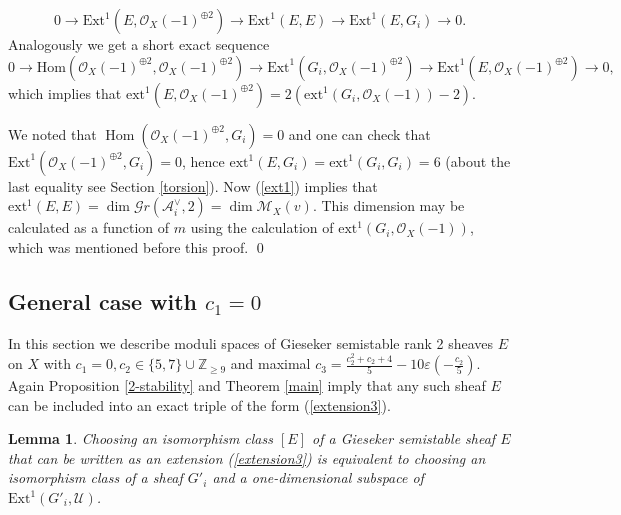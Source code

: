 \documentclass{amsart}
\DeclareMathOperator{\Hom}{Hom}
\newtheorem{lemma}[theorem]{Lemma}
\begin{document}
\begin{equation}\label{ext1}0\to\mathrm{Ext}^1(E,\mathcal O_X(-1)^{\oplus 2})\to\mathrm{Ext}^1(E,E)\to\mathrm{Ext}^1(E,G_i)\to 0.
\end{equation}
Analogously we get a short exact sequence
$$0\to\mathrm{Hom}(\mathcal O_X(-1)^{\oplus 2},\mathcal O_X(-1)^{\oplus 2})\to\mathrm{Ext}^1(G_i,\mathcal O_X(-1)^{\oplus 2})\to\mathrm{Ext}^1(E,\mathcal O_X(-1)^{\oplus 2})\to 0,$$
which implies that $\mathrm{ext}^1(E,\mathcal O_X(-1)^{\oplus 2})=2(\mathrm{ext}^1(G_i,\mathcal O_X(-1))-2)$. 

We noted that $\Hom(\mathcal O_X(-1)^{\oplus 2},G_i)=0$ and one can check that $\mathrm{Ext}^1(\mathcal O_X(-1)^{\oplus 2},G_i)=0$, hence $\mathrm{ext}^1(E,G_i)=\mathrm{ext}^1(G_i,G_i)=6$ (about the last equality see Section \ref{torsion}).  
Now (\ref{ext1}) implies that $\mathrm{ext}^1(E,E)=\dim \mathcal Gr(\mathcal A_i^\vee,2)=\dim \mathcal M_X(v)$. This dimension may be calculated as a function of $m$ using the calculation of $\mathrm{ext}^1(G_i,\mathcal O_X(-1))$, which was mentioned before this proof. \qed

\subsection{General case with $c_1=0$}\label{section 0} In this section we describe moduli spaces of Gieseker semistable rank 2 sheaves $E$ on $X$ with $c_1=0,c_2\in\{5, 7\}\cup\mathbb Z_{\ge 9}$ and maximal $c_3=\frac{c_2^2+c_2+4}{5}-10\varepsilon(-\frac{c_2}{5})$. 
Again Proposition \ref{2-stability} and Theorem \ref{main} imply that any such sheaf $E$ can be included into an exact triple of the form (\ref{extension3}).

\begin{lemma}\label{P}Choosing an isomorphism class $[E]$ of a Gieseker semistable sheaf $E$ that can be written as an extension (\ref{extension3}) is equivalent to choosing an isomorphism class of a sheaf $G'_i$ and a one-dimensional subspace of $\mathrm{Ext}^1(G'_i,\mathcal U)$.
\end{lemma}
\end{document}
